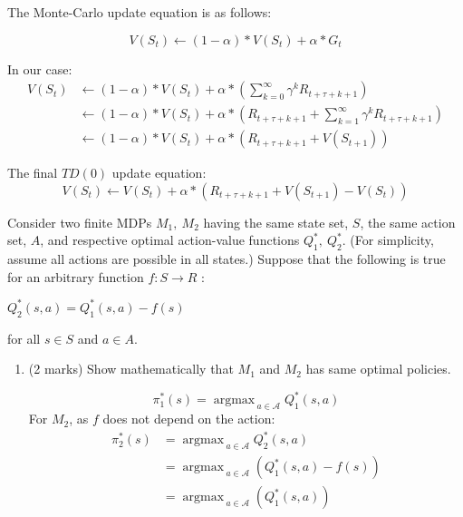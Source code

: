 \documentclass[addpoints,12pt,solution]{exam}
\DeclareMathOperator*{\argmax}{argmax\,}
\begin{document}
\begin{questions}
\begin{enumerate}[label=(\alph*)]
            \begin{solution}

                The Monte-Carlo update equation is as follows:

                \[V(S_t) \leftarrow (1-\alpha) * V(S_t) + \alpha * G_t\]

                In our case:
                \begin{align*}
                    V(S_t) &\leftarrow (1-\alpha) * V(S_t) + \alpha * ( \sum_{k=0}^{\infty} \gamma^{k}R_{t + \tau + k + 1})\\
                    &\leftarrow (1-\alpha) * V(S_t) + \alpha * (R_{t + \tau + k + 1} +  \sum_{k=1}^{\infty} \gamma^{k}R_{t + \tau + k + 1})\\
                    &\leftarrow (1-\alpha) * V(S_t) + \alpha * (R_{t + \tau + k + 1} + V(S_{t + 1}))
                \end{align*}

                The final $TD(0)$ update equation:
                \[
                    V(S_t) \leftarrow V(S_t) + \alpha * (R_{t + \tau + k + 1} + V(S_{t + 1}) - V(S_t))
                \]


            \end{solution}
        \end{enumerate}

         Consider two finite MDPs $M_1,\ M_2$ having the same state set, $S$, the same action set, $A$, and respective optimal action-value functions $Q^*_1,\ Q^*_2$. (For simplicity, assume all actions are possible in all states.) Suppose that the following is true for an arbitrary function $f: S \rightarrow R$ :\\
        \begin{center}
            $Q^*_2(s, a) = Q^*_1(s, a) - f(s)$
        \end{center}
        for all $s \in S$ and $a \in A$.
        \begin{enumerate}[label=(\alph*)]
            \item (2 marks) Show mathematically that $M_1$ and $M_2$ has same optimal policies.
            \begin{solution}
                \[
                    \pi^*_1(s) = \argmax_{a\in \mathcal{A}} Q^*_1(s,a)
                \]
                For $M_2$, as $f$ does not depend on the action:
                \begin{align*}
                    \pi^*_2(s) &= \argmax_{a\in \mathcal{A}} Q^*_2(s,a)\\
                    &= \argmax_{a\in \mathcal{A}}(Q^*_1(s,a) - f(s))\\
                    &= \argmax_{a\in \mathcal{A}}(Q^*_1(s,a))
                \end{align*}


\end{solution}
\end{enumerate}
\end{questions}
\end{document}
